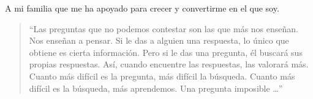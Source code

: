 \begin{dedicatoria}
A mi familia que me ha apoyado para crecer y convertirme en el que soy.
\vspace{50pt}
\begin{quote}
	``Las preguntas que no podemos contestar son las que más nos enseñan. Nos enseñan a pensar. Si le das a alguien una respuesta, lo único que obtiene es cierta información. Pero si le das una pregunta, él buscará sus propias respuestas. Así, cuando encuentre las respuestas, las valorará más. Cuanto más difícil es la pregunta, más difícil la búsqueda. Cuanto más difícil es la búsqueda, más aprendemos. Una pregunta imposible \ldots''
\end{quote}

\end{dedicatoria}

